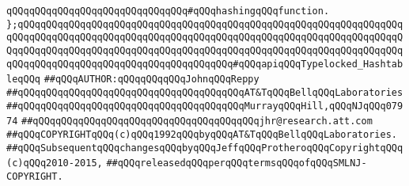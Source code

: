 \verb|qQQqqQQqqQQqqQQqqQQqqQQqqQQqqQQq#qQQqhashingqQQqfunction.|\newline
\newline
\verb|};qQQqqQQqqQQqqQQqqQQqqQQqqQQqqQQqqQQqqQQqqQQqqQQqqQQqqQQqqQQqqQQqqQQqqQQqqQQqqQQqqQQqqQQqqQQqqQQqqQQqqQQqqQQqqQQqqQQqqQQqqQQqqQQqqQQqqQQqqQQqqQQqqQQqqQQqqQQqqQQqqQQqqQQqqQQqqQQqqQQqqQQqqQQqqQQqqQQqqQQqqQQqqQQqqQQqqQQqqQQqqQQqqQQqqQQqqQQqqQQqqQQqqQQq#qQQqapiqQQqTypelocked_HashtableqQQq|\newline
\newline
\newline
\verb|##qQQqAUTHOR:qQQqqQQqqQQqJohnqQQqReppy|\newline
\verb|##qQQqqQQqqQQqqQQqqQQqqQQqqQQqqQQqqQQqqQQqAT&TqQQqBellqQQqLaboratories|\newline
\verb|##qQQqqQQqqQQqqQQqqQQqqQQqqQQqqQQqqQQqqQQqMurrayqQQqHill,qQQqNJqQQq07974|\newline
\verb|##qQQqqQQqqQQqqQQqqQQqqQQqqQQqqQQqqQQqqQQqjhr@research.att.com|\newline
\verb|##qQQqCOPYRIGHTqQQq(c)qQQq1992qQQqbyqQQqAT&TqQQqBellqQQqLaboratories.|\newline
\verb|##qQQqSubsequentqQQqchangesqQQqbyqQQqJeffqQQqProtheroqQQqCopyrightqQQq(c)qQQq2010-2015,|\newline
\verb|##qQQqreleasedqQQqperqQQqtermsqQQqofqQQqSMLNJ-COPYRIGHT.|\newline

